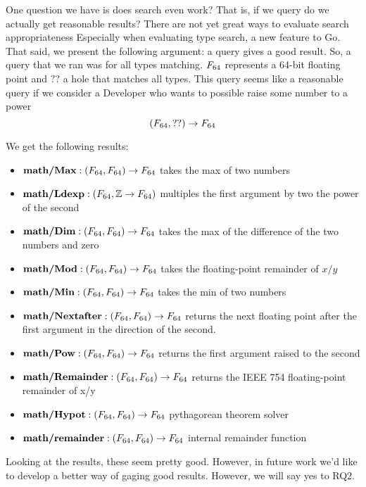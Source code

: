 One question we have is does search even work?
That is, if we query do we actually get reasonable results?
There are not yet great ways to evaluate search appropriateness
Especially when evaluating type search, a new feature to Go.
That said, we present the following argument:
a query gives a good result.
So, a query that we ran was for all types matching.
$F_{64}$ represents a 64-bit floating point and $??$
a hole that matches all types.
This query seems like a reasonable query if we consider a Developer who wants 
to possible raise some number to a power
$$(F_{64}, ??) \to F_{64}$$

We get the following results:
\begin{itemize}
    \item $\textbf{math/Max} : (F_{64}, F_{64}) \to F_{64}$ takes the max of two numbers  \\
    \item $\textbf{math/Ldexp} : (F_{64}, \mathbb{Z} \to F_{64})$ multiples the first argument by two the power of the second   \\
    \item $\textbf{math/Dim} : (F_{64}, F_{64}) \to F_{64}$ takes the max of the difference of the two numbers and zero  \\
    \item $\textbf{math/Mod} : (F_{64}, F_{64}) \to F_{64}$ takes the floating-point remainder of $x/y$ \\
    \item $\textbf{math/Min} : (F_{64}, F_{64}) \to F_{64}$ takes the min of two numbers  \\
    \item $\textbf{math/Nextafter} : (F_{64}, F_{64}) \to F_{64}$ returns the next floating point after the first argument in the direction of the second. \\
    \item $\textbf{math/Pow} : (F_{64}, F_{64}) \to F_{64}$ returns the first argument raised to the second  \\
    \item $\textbf{math/Remainder} : (F_{64}, F_{64}) \to F_{64}$ returns the IEEE 754 floating-point remainder of x/y \\
    \item $\textbf{math/Hypot} : (F_{64}, F_{64}) \to F_{64}$ pythagorean theorem solver \\
    \item $\textbf{math/remainder} : (F_{64}, F_{64}) \to F_{64}$ internal remainder function \\
\end{itemize}

Looking at the results, these seem pretty good.
However, in future work we'd like to develop a better way of gaging good results.
However, we will say yes to RQ2.